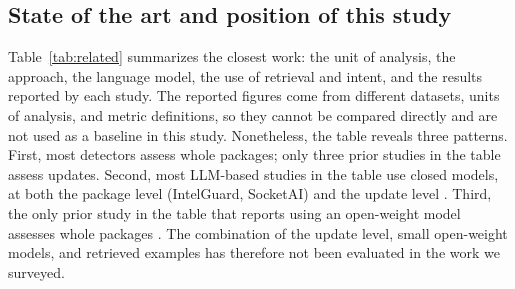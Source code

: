\documentclass[a4paper,fleqn]{cas-dc}
\begin{document}
\subsection{State of the art and position of this study}
Table~\ref{tab:related} summarizes the closest work: the unit of analysis, the
approach, the language model, the use of retrieval and intent, and the
results reported by each study. The reported figures come from different
datasets, units of analysis, and metric definitions, so they cannot be compared
directly and are not used as a baseline in this study. Nonetheless, the
table reveals three patterns. First, most detectors assess whole packages; only
three prior studies in the table assess updates. Second, most LLM-based studies
in the table use closed models, at both the package level (IntelGuard, SocketAI)
and the update level \citep{wyss2025evaluating}. Third, the only prior study in
the table that reports using an open-weight model assesses whole packages
\citep{nguyen2025taint}. The combination of the update level, small
open-weight models, and retrieved examples has therefore not been
evaluated in the work we surveyed.
\end{document}
